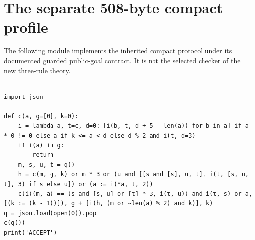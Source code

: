 \documentclass[11pt,letterpaper]{article}
\theoremstyle{definition}
\begin{document}
\section{The separate 508-byte compact profile}

The following module implements the inherited compact protocol under its documented guarded public-goal contract. It is not the selected checker of the new three-rule theory.

\begin{lstlisting}

import json

def c(a, g=[0], k=0):
    i = lambda a, t=c, d=0: [i(b, t, d + 5 - len(a)) for b in a] if a * 0 != 0 else a if k <= a < d else d % 2 and i(t, d=3)
    if i(a) in g:
        return
    m, s, u, t = q()
    h = c(m, g, k) or m * 3 or (u and [[s and [s], u, t], i(t, [s, u, t], 3) if s else u]) or (a := i(*a, t, 2))
    c(i((m, a) == (s and [s, u] or [t] * 3, i(t, u)) and i(t, s) or a, [(k := (k - 1))]), g + [i(h, (m or ~len(a) % 2) and k)], k)
q = json.load(open(0)).pop
c(q())
print('ACCEPT')

\end{lstlisting}
\end{document}
